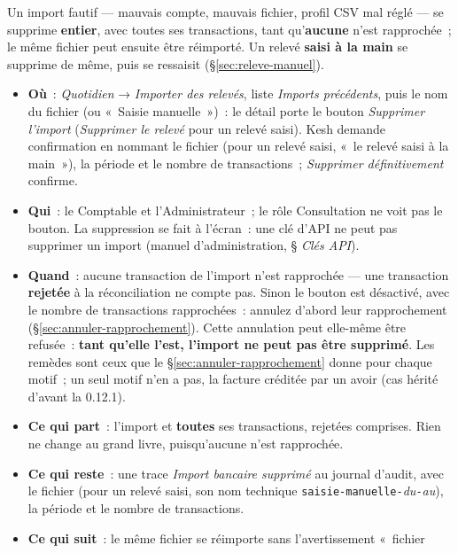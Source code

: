 \documentclass[a4paper,11pt,oneside]{article}
\begin{document}
Un import fautif --- mauvais compte, mauvais fichier, profil CSV mal réglé --- se supprime
\textbf{entier}, avec toutes ses transactions, tant qu'\textbf{aucune} n'est rapprochée~; le
même fichier peut ensuite être réimporté. Un relevé \textbf{saisi à la main} se supprime de même,
puis se ressaisit (\S\ref{sec:releve-manuel}).

\begin{itemize}
    \item \textbf{Où}~: \emph{Quotidien} → \emph{Importer des relevés}, liste \emph{Imports
          précédents}, puis le nom du fichier (ou «~Saisie manuelle~»)~: le détail porte le
          bouton \emph{Supprimer l'import} (\emph{Supprimer le relevé} pour un relevé saisi).
          Kesh demande confirmation en nommant le fichier (pour un relevé saisi, «~le relevé
          saisi à la main~»), la période et le nombre de transactions~; \emph{Supprimer
          définitivement} confirme.
    \item \textbf{Qui}~: le Comptable et l'Administrateur~; le rôle Consultation ne voit pas le
          bouton. La suppression se fait à l'écran~: une clé d'API ne peut pas supprimer un
          import (manuel d'administration, § \emph{Clés API}).
    \item \textbf{Quand}~: aucune transaction de l'import n'est rapprochée --- une transaction
          \textbf{rejetée} à la réconciliation ne compte pas. Sinon le bouton est désactivé, avec le
          nombre de transactions rapprochées~: annulez d'abord leur rapprochement
          (\S\ref{sec:annuler-rapprochement}). Cette annulation peut elle-même être
          refusée~: \textbf{tant qu'elle l'est, l'import ne peut pas être supprimé}. Les remèdes
          sont ceux que le \S\ref{sec:annuler-rapprochement} donne pour chaque motif~; un seul
          motif n'en a pas, la facture créditée par un avoir (cas hérité d'avant la 0.12.1).
    \item \textbf{Ce qui part}~: l'import et \textbf{toutes} ses transactions, rejetées
          comprises. Rien ne change au grand livre, puisqu'aucune n'est rapprochée.
    \item \textbf{Ce qui reste}~: une trace \emph{Import bancaire supprimé} au journal
          d'audit, avec le fichier (pour un relevé saisi, son nom technique
          \texttt{saisie-manuelle-}\emph{du}\texttt{-}\emph{au}), la période et le nombre de
          transactions.
    \item \textbf{Ce qui suit}~: le même fichier se réimporte sans l'avertissement «~fichier

\end{itemize}
\end{document}
